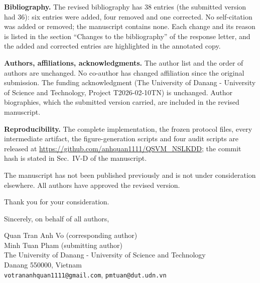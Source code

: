 \documentclass[11pt,a4paper]{article}
\begin{document}
\textbf{Bibliography.} The revised bibliography has 38 entries (the submitted
version had 36): six entries were added, four removed and one corrected. No
self-citation was added or removed; the manuscript contains none. Each change
and its reason is listed in the section ``Changes to the bibliography'' of the
response letter, and the added and corrected entries are highlighted in the
annotated copy.

\textbf{Authors, affiliations, acknowledgments.} The author list and the order
of authors are unchanged. No co-author has changed affiliation since the
original submission. The funding acknowledgment (The University of Danang -
University of Science and Technology, Project T2026-02-10TN) is unchanged.
Author biographies, which the submitted version carried, are included in the
revised manuscript.

\textbf{Reproducibility.} The complete implementation, the frozen protocol
files, every intermediate artifact, the figure-generation scripts and four audit
scripts are released at \url{https://github.com/anhquan1111/QSVM_NSLKDD}; the
commit hash is stated in Sec.~IV-D of the manuscript.

The manuscript has not been published previously and is not under
consideration elsewhere. All authors have approved the revised version.

Thank you for your consideration.

\vspace{10pt}
Sincerely, on behalf of all authors,

\vspace{18pt}
Quan Tran Anh Vo (corresponding author)\\
Minh Tuan Pham (submitting author)\\
The University of Danang - University of Science and Technology\\
Danang 550000, Vietnam\\
\texttt{votrananhquan1111@gmail.com}, \texttt{pmtuan@dut.udn.vn}
\end{document}
